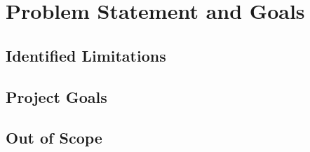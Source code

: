 \chapter{Problem Statement and Goals} \label{ch:problemdescription}


\section{Identified Limitations}
\lipsum[1]


\section{Project Goals}
\lipsum[1]


\section{Out of Scope}
\lipsum[1]

